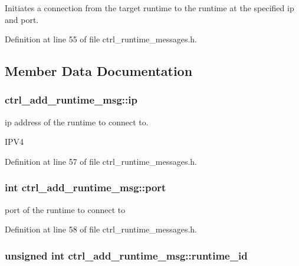 Initiates a connection from the target runtime to the runtime at the specified ip and port. 

Definition at line 55 of file ctrl\-\_\-runtime\-\_\-messages.\-h.



\subsection{Member Data Documentation}
\hypertarget{structctrl__add__runtime__msg_acc02f0403e49f0b92466de8703a2fc55}{
\subsubsection[{ip}]{ ctrl\-\_\-add\-\_\-runtime\-\_\-msg\-::ip}}\label{structctrl__add__runtime__msg_acc02f0403e49f0b92466de8703a2fc55}


ip address of the runtime to connect to. 

I\-P\-V4 

Definition at line 57 of file ctrl\-\_\-runtime\-\_\-messages.\-h.

\hypertarget{structctrl__add__runtime__msg_a191816d657a91e53fb58ec1d73b2339e}{
\subsubsection[{port}]{\setlength{\rightskip}{0pt plus 5cm}int ctrl\-\_\-add\-\_\-runtime\-\_\-msg\-::port}}\label{structctrl__add__runtime__msg_a191816d657a91e53fb58ec1d73b2339e}


port of the runtime to connect to 



Definition at line 58 of file ctrl\-\_\-runtime\-\_\-messages.\-h.

\hypertarget{structctrl__add__runtime__msg_ad0b16bb9b47592729655a1f597694594}{
\subsubsection[{runtime\-\_\-id}]{\setlength{\rightskip}{0pt plus 5cm}unsigned int ctrl\-\_\-add\-\_\-runtime\-\_\-msg\-::runtime\-\_\-id}}\label{structctrl__add__runtime__msg_ad0b16bb9b47592729655a1f597694594}


